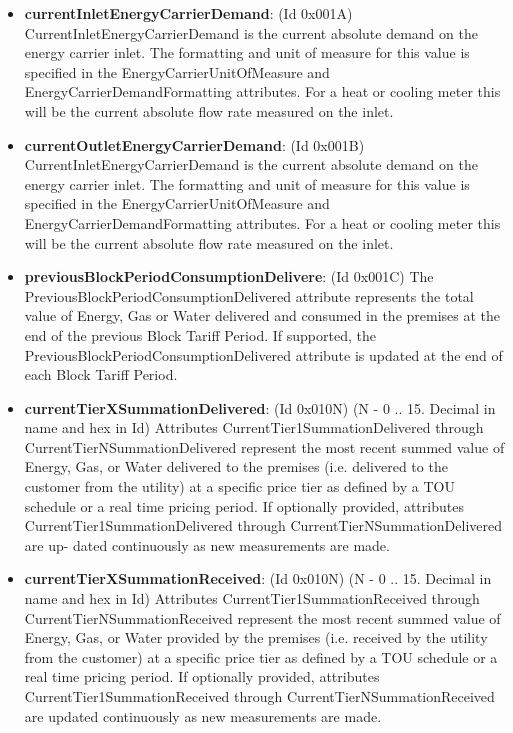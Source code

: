 \begin{itemize}
\item \textbf{currentInletEnergyCarrierDemand}: (Id 0x001A) CurrentInletEnergyCarrierDemand is the current absolute demand on the energy carrier inlet. The formatting and unit of measure for this value is specified in the EnergyCarrierUnitOfMeasure and EnergyCarrierDemandFormatting attributes. For a heat or cooling meter this will be the current absolute flow rate measured on the inlet.
\item \textbf{currentOutletEnergyCarrierDemand}: (Id 0x001B) CurrentInletEnergyCarrierDemand is the current absolute demand on the energy carrier inlet. The formatting and unit of measure for this value is specified in the EnergyCarrierUnitOfMeasure and EnergyCarrierDemandFormatting attributes. For a heat or cooling meter this will be the current absolute flow rate measured on the inlet.
\item \textbf{previousBlockPeriodConsumptionDelivere}: (Id 0x001C) The PreviousBlockPeriodConsumptionDelivered attribute represents the total value of Energy, Gas or Water delivered and consumed in the premises at the end of the previous Block Tariff Period. If supported, the PreviousBlockPeriodConsumptionDelivered attribute is updated at the end of each Block Tariff Period.
\item \textbf{currentTierXSummationDelivered}: (Id 0x010N) (N - 0 .. 15. Decimal in name and hex in Id) Attributes CurrentTier1SummationDelivered through CurrentTierNSummationDelivered represent the most recent summed value of Energy, Gas, or Water delivered to the premises (i.e. delivered to the customer from the utility) at a specific price tier as defined by a TOU schedule or a real time pricing period. If optionally provided, attributes CurrentTier1SummationDelivered through CurrentTierNSummationDelivered are up- dated continuously as new measurements are made.
\item \textbf{currentTierXSummationReceived}: (Id 0x010N) (N - 0 .. 15. Decimal in name and hex in Id) Attributes CurrentTier1SummationReceived through CurrentTierNSummationReceived represent the most recent summed value of Energy, Gas, or Water provided by the premises (i.e. received by the utility from the customer) at a specific price tier as defined by a TOU schedule or a real time pricing period. If optionally provided, attributes CurrentTier1SummationReceived through CurrentTierNSummationReceived are updated continuously as new measurements are made.

\end{itemize}

